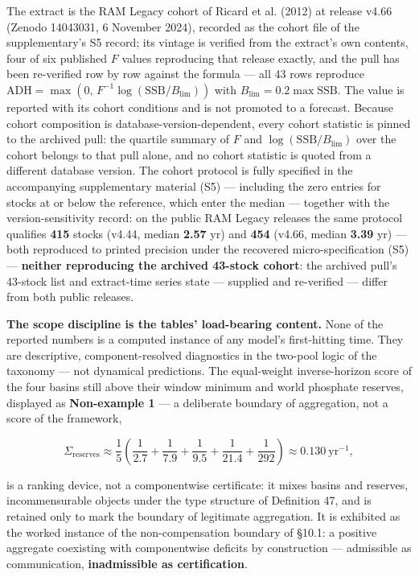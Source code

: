 \documentclass[11pt]{article}
\begin{document}
The extract is the RAM Legacy cohort of Ricard et al. (2012) at release v4.66 (Zenodo 14043031, 6 November 2024), recorded as the cohort file of the supplementary's S5 record; its vintage is verified from the extract's own contents, four of six published \(F\) values reproducing that release exactly, and the pull has been re-verified row by row against the formula --- all 43 rows reproduce \(\mathrm{ADH} =\allowbreak{} \max(0,\allowbreak{}\,\allowbreak{} F^{-1}\log(\mathrm{SSB}/B_{\lim}))\) with \(B_{\lim} =\allowbreak{} 0.2 \max \mathrm{SSB}\). The value is reported with its cohort conditions and is not promoted to a forecast. Because cohort composition is database-version-dependent, every cohort statistic is pinned to the archived pull: the quartile summary of \(F\) and \(\log(\mathrm{SSB}/B_{\lim})\) over the cohort belongs to that pull alone, and no cohort statistic is quoted from a different database version. The cohort protocol is fully specified in the accompanying supplementary material (S5) --- including the zero entries for stocks at or below the reference, which enter the median --- together with the version-sensitivity record: on the public RAM Legacy releases the same protocol qualifies \textbf{415} stocks (v4.44, median \textbf{2.57} yr) and \textbf{454} (v4.66, median \textbf{3.39} yr) --- both reproduced to printed precision under the recovered micro-specification (S5) --- \textbf{neither reproducing the archived 43-stock cohort}: the archived pull's 43-stock list and extract-time series state --- supplied and re-verified --- differ from both public releases.

\textbf{The scope discipline is the tables' load-bearing content.} None of the reported numbers is a computed instance of any model's first-hitting time. They are descriptive, component-resolved diagnostics in the two-pool logic of the taxonomy --- not dynamical predictions. The equal-weight inverse-horizon score of the four basins still above their window minimum and world phosphate reserves, displayed as \textbf{Non-example 1} --- a deliberate boundary of aggregation, not a score of the framework, 

$$\Sigma_{\mathrm{reserves}} \approx \frac{1}{5}\left( \frac{1}{2.7} + \frac{1}{7.9} + \frac{1}{9.5} + \frac{1}{21.4} + \frac{1}{292} \right) \approx 0.130\ \mathrm{yr}^{-1},$$

 is a ranking device, not a componentwise certificate: it mixes basins and reserves, incommensurable objects under the type structure of Definition 47, and is retained only to mark the boundary of legitimate aggregation. It is exhibited as the worked instance of the non-compensation boundary of \S10.1: a positive aggregate coexisting with componentwise deficits by construction --- admissible as communication, \textbf{inadmissible as certification}.
\end{document}

